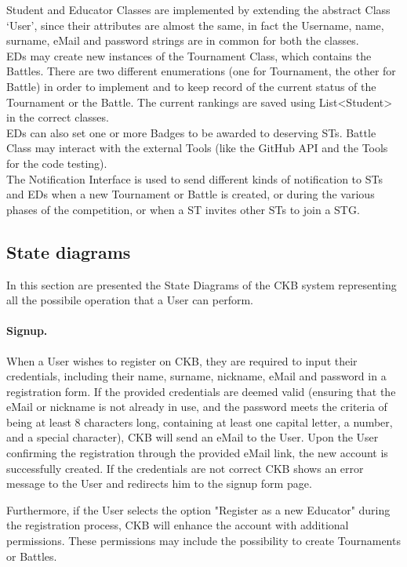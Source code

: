 Student and Educator Classes are implemented by extending the abstract Class ‘User’, since their attributes are almost the same, in fact the Username, name, surname, eMail and password strings are in common for both the classes.\\
EDs may create new instances of the Tournament Class, which contains the Battles. There are two different enumerations (one for Tournament, the other for Battle) in order to implement and to keep record of the current status of the Tournament or the Battle. The current rankings are saved using List<Student> in the correct classes. \\
EDs can also set one or more Badges to be awarded to deserving STs. Battle Class may interact with the external Tools (like the GitHub API and the Tools for the code testing). \\
The Notification Interface is used to send different kinds of notification to STs and EDs when a new Tournament or Battle is created, or during the various phases of the competition, or when a ST invites other STs to join a STG.\\


\subsection{State diagrams}
\label{subsec:state_diagrams}%
In this section are presented the State Diagrams of the CKB system representing all the possibile operation that a User can perform.
\paragraph{Signup.}
When a User wishes to register on CKB, they are required to input their credentials, including their name, surname, nickname, eMail and password in a registration form. If the provided credentials are deemed valid (ensuring that the eMail or nickname is not already in use, and the password meets the criteria of being at least 8 characters long, containing at least one capital letter, a number, and a special character), CKB will send an eMail to the User. Upon the User confirming the registration through the provided eMail link, the new account is successfully created. If the credentials are not correct CKB shows an error message to the User and redirects him to the signup form page.

Furthermore, if the User selects the option "Register as a new Educator" during the registration process, CKB will enhance the account with additional permissions. These permissions may include the possibility to create Tournaments or Battles.

